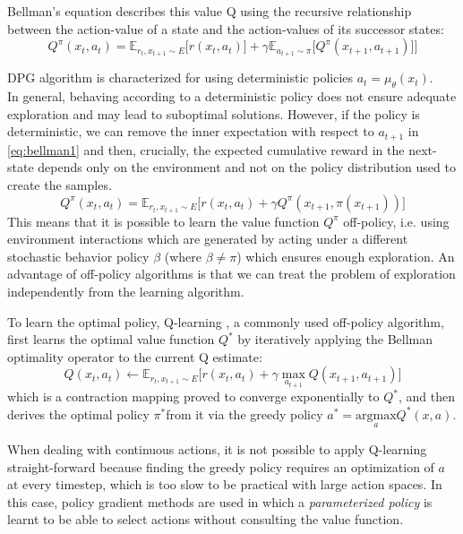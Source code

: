 Bellman's equation describes this value Q using the 
recursive relationship between the action-value of a state and the action-values of its
successor states:
\begin{equation}
    Q^\pi(x_t,a_t) = \mathbb E_{r_t,x_{t+1} \sim E}\Big[ r(x_t,a_t)] + \gamma \mathbb E_{a_{t+1}\sim \pi}\big[Q^\pi(x_{t+1},a_{t+1})\big]\Big] \label{eq:bellman1}
\end{equation}

DPG algorithm \citep{silver2014b} is characterized for using deterministic policies $a_t=\mu_{\theta}(x_t)$.\\
In general, behaving according to a deterministic policy does not ensure adequate exploration
and may lead to suboptimal solutions. 
However, if the policy is deterministic, we can remove the inner expectation with respect 
to $a_{t+1}$ in \ref{eq:bellman1} and then, crucially, the expected cumulative reward in the next-state 
depends only on the environment and not on the policy distribution used to create the samples.
\begin{equation}
    Q^\pi(x_t,a_t) = \mathbb E_{r_t,x_{t+1} \sim E}\Big[ r(x_t,a_t) + \gamma Q^\pi(x_{t+1},\pi(x_{t+1}))\Big]
\end{equation}
\label{par:offpolicy}
This means that it is possible to learn the value function
$Q^\pi$ off-policy, i.e. using environment interactions which are generated by acting
under a different stochastic
behavior policy $\beta$ (where $\beta \neq \pi$) which ensures enough exploration.
An advantage of off-policy algorithms is that we can treat the problem of exploration
independently from the learning algorithm.

To learn the optimal policy, Q-learning \cite{Watkins1992}, a commonly used off-policy algorithm, first learns the optimal 
value function $Q^*$ by iteratively applying the Bellman optimality operator to the current Q estimate:
\begin{equation}
    Q(x_t,a_t) \leftarrow \mathbb E_{r_t,x_{t+1} \sim E}\Big[ r(x_t,a_t) + \gamma \underset{a_{t+1}} \max Q(x_{t+1},a_{t+1})\Big]
\end{equation}
which is a contraction mapping proved to converge exponentially to $Q^*$, and then
derives the optimal policy $\pi^*$from it via the greedy policy $a^*=\underset{a}{\text{argmax}} Q^*(x,a)$.

When dealing with continuous actions, it is not possible to apply Q-learning
straight-forward because finding the greedy policy requires an optimization of $a$ at 
every timestep, which is too slow to be practical with large action spaces.
In this case, policy gradient methods are used in which a \textit{parameterized policy} is learnt 
to be able to select actions without consulting the value function.


